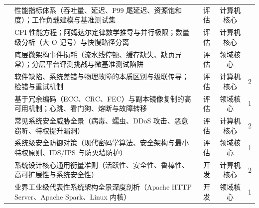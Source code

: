 \begin{strip}
\begin{tabularx}{\textwidth}{p{} Y c c c}
\midrule
{} 
& 性能指标体系（吞吐量、延迟、P99 尾延迟、资源饱和度）；工作负载建模与基准测试集 & 评估 & 计算机核心 &  \\
& CPI 性能方程；阿姆达尔定律数学推导与并行极限；数量级分析（大 O 记号）与快慢路径分离 & 评估 & 计算机核心 & \\
& 底层微架构事件损耗（流水线停顿、缓存缺失、缺页异常）；分层平台评测挑战与微基准测试陷阱 & 评估 & 领域核心 & \\
\midrule
{} 
& 软件缺陷、系统差错与物理故障的本质区别与级联传导；检错与重试机制 & 评估 & 计算机核心 & 2 \\
& 基于冗余编码（ECC、CRC、FEC）与副本镜像复制的高可用机制；心跳、看门狗、熔断与故障转移 & 评估 & 领域核心 & 1 \\
\midrule
{} 
& 常见系统安全威胁全景（病毒、蠕虫、DDoS 攻击、恶意窃听、特权提升漏洞） & 评估 & 计算机核心 & 2 \\
& 系统级安全防御对策（现代密码学算法、安全架构与最小特权原则、IDS/IPS 与防火墙防护） & 评估 & 领域核心 & 1 \\
\midrule
{} 
& 系统设计核心通用衡量准则（活跃性、安全性、鲁棒性、高可扩展性与系统安全性） & 开发 & 计算机核心 & 2 \\
& 业界工业级代表性系统架构全景深度剖析（Apache HTTP Server、Apache Spark、Linux 内核） & 开发 & 领域核心 & 1 \\
\bottomrule
\end{tabularx}
\end{strip}
